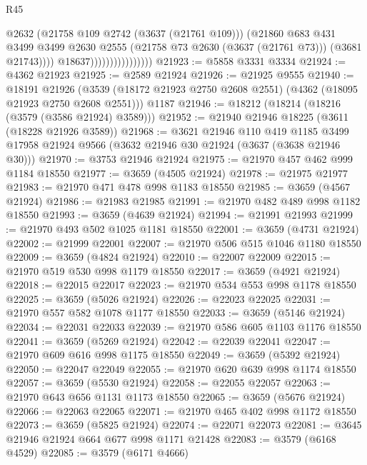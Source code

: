 \begin{lexlean}{R45}
\begin{coremodule}
                                        @2632
                                        (@21758 @109 @2742 (@3637 (@21761 @109)))
                                        (@21860
                                          @683
                                          @431
                                          @3499
                                          @3499
                                          @2630
                                          @2555
                                          (@21758 @73 @2630 (@3637 (@21761 @73)))
                                          (@3681 @21743))))
                                    @18637))))))))))))))))
@21923 := @5858 @3331 @3334
@21924 := @4362 @21923
@21925 := @2589 @21924
@21926 := @21925 @9555
@21940 := @18191
    @21926
    (@3539 (@18172 @21923 @2750 @2608 @2551) (@4362 (@18095 @21923 @2750 @2608 @2551)))
    @1187
@21946 := @18212 (@18214 (@18216 (@3579 (@3586 @21924) @3589)))
@21952 := @21940 @21946 @18225 (@3611 (@18228 @21926 @3589))
@21968 := @3621
    @21946
    @110
    @419
    @1185
    @3499
    @17958
    @21924
    @9566
    (@3632 @21946 @30 @21924 (@3637 (@3638 @21946 @30)))
@21970 := @3753 @21946 @21924
@21975 := @21970 @457 @462 @999 @1184 @18550
@21977 := @3659 (@4505 @21924)
@21978 := @21975 @21977
@21983 := @21970 @471 @478 @998 @1183 @18550
@21985 := @3659 (@4567 @21924)
@21986 := @21983 @21985
@21991 := @21970 @482 @489 @998 @1182 @18550
@21993 := @3659 (@4639 @21924)
@21994 := @21991 @21993
@21999 := @21970 @493 @502 @1025 @1181 @18550
@22001 := @3659 (@4731 @21924)
@22002 := @21999 @22001
@22007 := @21970 @506 @515 @1046 @1180 @18550
@22009 := @3659 (@4824 @21924)
@22010 := @22007 @22009
@22015 := @21970 @519 @530 @998 @1179 @18550
@22017 := @3659 (@4921 @21924)
@22018 := @22015 @22017
@22023 := @21970 @534 @553 @998 @1178 @18550
@22025 := @3659 (@5026 @21924)
@22026 := @22023 @22025
@22031 := @21970 @557 @582 @1078 @1177 @18550
@22033 := @3659 (@5146 @21924)
@22034 := @22031 @22033
@22039 := @21970 @586 @605 @1103 @1176 @18550
@22041 := @3659 (@5269 @21924)
@22042 := @22039 @22041
@22047 := @21970 @609 @616 @998 @1175 @18550
@22049 := @3659 (@5392 @21924)
@22050 := @22047 @22049
@22055 := @21970 @620 @639 @998 @1174 @18550
@22057 := @3659 (@5530 @21924)
@22058 := @22055 @22057
@22063 := @21970 @643 @656 @1131 @1173 @18550
@22065 := @3659 (@5676 @21924)
@22066 := @22063 @22065
@22071 := @21970 @465 @402 @998 @1172 @18550
@22073 := @3659 (@5825 @21924)
@22074 := @22071 @22073
@22081 := @3645 @21946 @21924 @664 @677 @998 @1171 @21428
@22083 := @3579 (@6168 @4529)
@22085 := @3579 (@6171 @4666)

\end{coremodule}
\end{lexlean}
